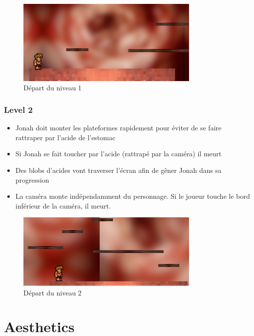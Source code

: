 \documentclass{prologArticle}
\begin{document}
\begin{figure}[H]
    \centering
    \includegraphics[width=0.8\textwidth]{res/level1.png}
    \caption{Départ du niveau 1}
\end{figure}

\subsubsection{Level 2}

\begin{itemize}
    \item Jonah doit monter les plateformes rapidement pour éviter de se faire rattraper par l'acide de l'estomac
    \item Si Jonah se fait toucher par l'acide (rattrapé par la caméra) il meurt
    \item Des blobs d'acides vont traverser l'écran afin de gêner Jonah dans sa progression
    \item La caméra monte indépendamment du personnage. Si le joueur touche le bord inférieur de la caméra, il meurt.
\end{itemize}

\begin{figure}[H]
    \centering
    \includegraphics[width=0.8\textwidth]{res/level2.png}
    \caption{Départ du niveau 2}
\end{figure}


\section{Aesthetics}
\end{document}
